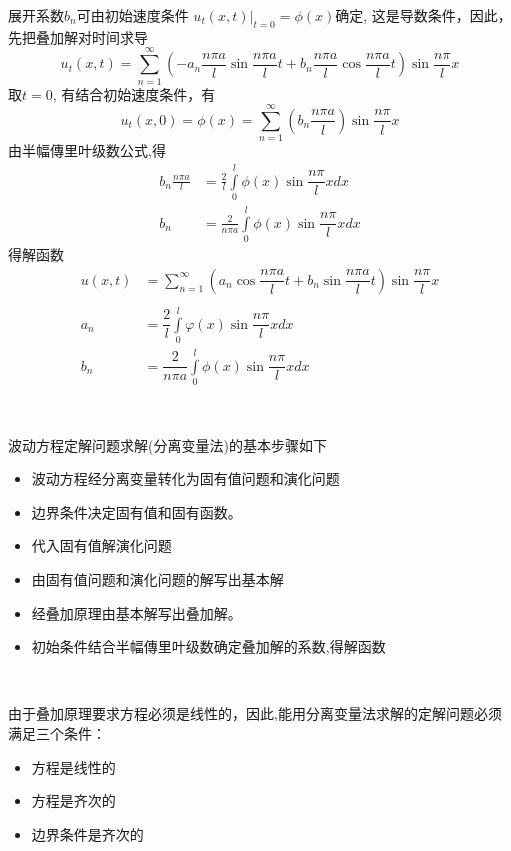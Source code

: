 展开系数$b_n$可由初始速度条件 $u_t(x,t)|_{t=0}= \phi (x)$确定, 这是导数条件，因此，先把叠加解对时间求导
$$ u_t(x,t) = \sum\limits_{n=1}^{\infty }  (- a_n \dfrac{ n\pi a}{l} \sin\dfrac{ n\pi a}{l}t+ b_n \dfrac{ n\pi a}{l}  \cos \dfrac{ n\pi a}{l}t) \sin \dfrac{ n\pi }{l}x $$
取$t=0$, 有结合初始速度条件，有
$$ u_t(x,0)= \phi (x) = \sum_{n=1}^{\infty } (b_n \frac{ n\pi a}{l}) \sin \frac{ n\pi }{l}x $$
由半幅傳里叶级数公式,得
$$ \begin{aligned}
	b_n \frac{ n\pi a}{l} 
	&=  \frac{2}{l}\int\limits_{0 }^{l}  \phi (x) \sin \dfrac{ n\pi }{l}x dx   \\
	b_n &=  \frac{2} { n\pi a}  \int\limits_{0 }^{l}   \phi (x) \sin \dfrac{ n\pi }{l}x dx
\end{aligned}$$
得解函数
$$ \displaystyle \boxed{\begin{aligned}
	u(x,t) &= \sum\limits_{n=1}^{\infty }  (a_n\cos\dfrac{ n\pi a}{l}t+ b_n\sin \dfrac{ n\pi a}{l}t) \sin \dfrac{ n\pi }{l}x \\ 
	\\
	a_n &=\dfrac{2}{l}\int\limits_{0 }^{l}  \varphi (x) \sin \dfrac{ n\pi }{l}x dx   \\
	b_n &=\dfrac{2} { n\pi a}  \int\limits_{0 }^{l}   \phi (x) \sin \dfrac{ n\pi }{l}x dx  
\end{aligned}} $$


~~\\ 
\begin{hint}
	波动方程定解问题求解(分离变量法)的基本步骤如下
\begin{itemize}
	\item 波动方程经分离变量转化为固有值问题和演化问题
	\item 边界条件决定固有值和固有函数。
	\item 代入固有值解演化问题
	\item 由固有值问题和演化问题的解写出基本解
	\item 经叠加原理由基本解写出叠加解。
	\item 初始条件结合半幅傳里叶级数确定叠加解的系数,得解函数
\end{itemize}
\end{hint}
~~\\ 
\begin{hint}
由于叠加原理要求方程必须是线性的，因此,能用分离变量法求解的定解问题必须满足三个条件： 
	\begin{itemize}
		\item 方程是线性的
		\item 方程是齐次的 
		\item 边界条件是齐次的
	\end{itemize}
\end{hint}
~~\\ 

